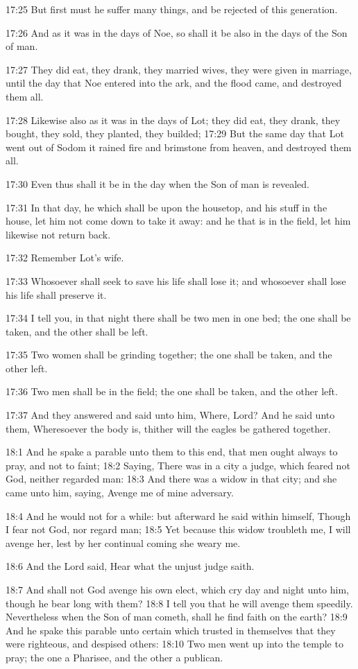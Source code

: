 17:25 But first must he suffer many things, and be rejected of this generation.

17:26 And as it was in the days of Noe, so shall it be also in the days of the Son of man.

17:27 They did eat, they drank, they married wives, they were given in marriage, until the day that Noe entered into the ark, and the flood came, and destroyed them all.

17:28 Likewise also as it was in the days of Lot; they did eat, they drank, they bought, they sold, they planted, they builded; 17:29 But the same day that Lot went out of Sodom it rained fire and brimstone from heaven, and destroyed them all.

17:30 Even thus shall it be in the day when the Son of man is revealed.

17:31 In that day, he which shall be upon the housetop, and his stuff in the house, let him not come down to take it away: and he that is in the field, let him likewise not return back.

17:32 Remember Lot's wife.

17:33 Whosoever shall seek to save his life shall lose it; and whosoever shall lose his life shall preserve it.

17:34 I tell you, in that night there shall be two men in one bed; the one shall be taken, and the other shall be left.

17:35 Two women shall be grinding together; the one shall be taken, and the other left.

17:36 Two men shall be in the field; the one shall be taken, and the other left.

17:37 And they answered and said unto him, Where, Lord? And he said unto them, Wheresoever the body is, thither will the eagles be gathered together.

18:1 And he spake a parable unto them to this end, that men ought always to pray, and not to faint; 18:2 Saying, There was in a city a judge, which feared not God, neither regarded man: 18:3 And there was a widow in that city; and she came unto him, saying, Avenge me of mine adversary.

18:4 And he would not for a while: but afterward he said within himself, Though I fear not God, nor regard man; 18:5 Yet because this widow troubleth me, I will avenge her, lest by her continual coming she weary me.

18:6 And the Lord said, Hear what the unjust judge saith.

18:7 And shall not God avenge his own elect, which cry day and night unto him, though he bear long with them?  18:8 I tell you that he will avenge them speedily. Nevertheless when the Son of man cometh, shall he find faith on the earth?  18:9 And he spake this parable unto certain which trusted in themselves that they were righteous, and despised others: 18:10 Two men went up into the temple to pray; the one a Pharisee, and the other a publican.

